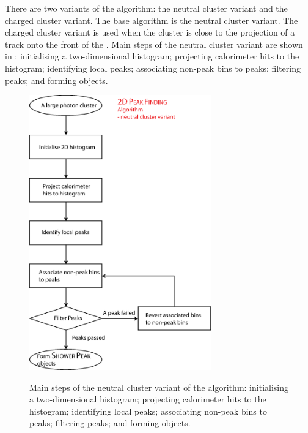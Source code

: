 
There are two variants of the \peakFinding algorithm: the neutral cluster variant and the charged cluster variant. The base algorithm is  the neutral cluster variant. The charged cluster variant is used when the cluster is close to the projection of a track onto the front of the \ECAL. Main steps of the  neutral cluster variant are shown in : initialising a two-dimensional histogram; projecting  calorimeter hits to the histogram; identifying local peaks; associating non-peak bins to peaks; filtering peaks; and forming \ShowerPeak objects.



\begin{figure}[tbph]
\centering
{\includegraphics[width=0.7\textwidth]{photon/2DpeakFinding2}}
\caption[Flow chart for \peakFinding algorithm neutral cluster variant.]
{Main steps of the  neutral cluster variant of the \peakFinding algorithm: initialising a two-dimensional histogram; projecting  calorimeter hits to the histogram; identifying local peaks; associating non-peak bins to peaks; filtering peaks; and forming \ShowerPeak objects.}
\label{fig:photonPeakFindingFlowNeutral}
\end{figure}


